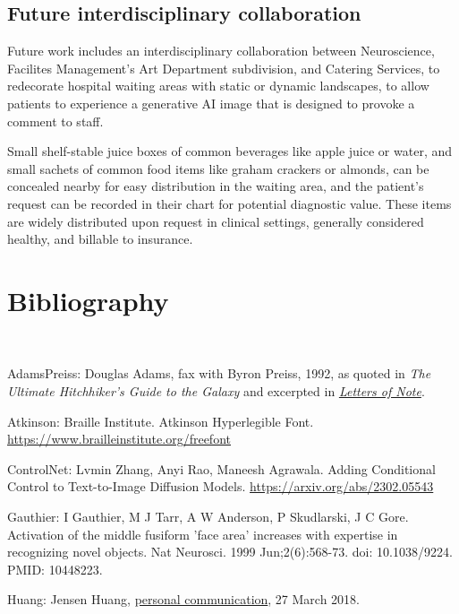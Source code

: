 \documentclass{article}
\begin{document}
\subsection{Future interdisciplinary collaboration}

Future work includes an interdisciplinary collaboration between Neuroscience, Facilites Management's Art Department subdivision, and Catering Services, to redecorate hospital waiting areas with static or dynamic landscapes, to allow patients to experience a generative AI image that is designed to provoke a comment to staff.

Small shelf-stable juice boxes of common beverages like apple juice or water, and small sachets of common food items like graham crackers or almonds, can be concealed nearby for easy distribution in the waiting area, and the patient's request can be recorded in their chart for potential diagnostic value. These items are widely distributed upon request in clinical settings, generally considered healthy, and billable to insurance.




\newpage

\section*{Bibliography}

~\setlength{\parindent}{0pt}\setlength{\parskip}{1em}

AdamsPreiss: Douglas Adams, fax with Byron Preiss, 1992, as quoted in \textit{The Ultimate Hitchhiker's Guide to the Galaxy} and excerpted in \href{https://web.archive.org/web/20230330020214/https://lettersofnote.com/2023/02/11/please-dont-let-anyone-americanise-it/}{\textit{Letters of Note}}.

Atkinson: Braille Institute. Atkinson Hyperlegible Font. \url{https://www.brailleinstitute.org/freefont}

ControlNet: Lvmin Zhang, Anyi Rao, Maneesh Agrawala. Adding Conditional Control to Text-to-Image Diffusion Models. \url{https://arxiv.org/abs/2302.05543}

Gauthier: I Gauthier, M J Tarr, A W Anderson, P Skudlarski, J C Gore. Activation of the middle fusiform 'face area' increases with expertise in recognizing novel objects. Nat Neurosci. 1999 Jun;2(6):568-73. doi: 10.1038/9224. PMID: 10448223.

Huang: Jensen Huang, \href{https://s201.q4cdn.com/141608511/files/doc_presentations/2018/04/JHH_GTC2018_FINAL_PRESENTED_16X9.pdf}{personal communication}, 27 March 2018.
\end{document}
